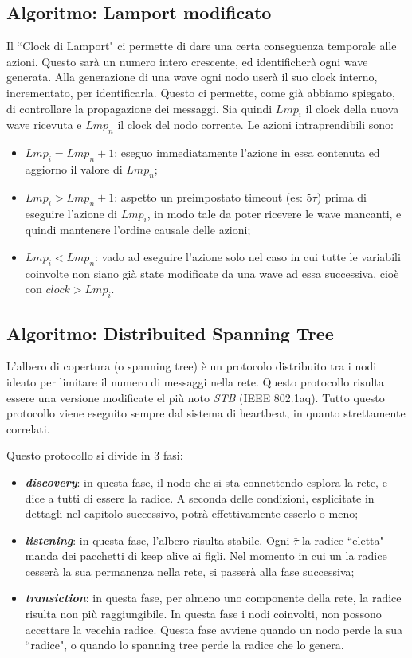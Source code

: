 \documentclass[italian]{memoir}
\begin{document}
\subsection{Algoritmo: Lamport modificato}
Il ``Clock di Lamport" ci permette di dare una certa conseguenza temporale alle azioni.
	   Questo sarà un numero intero crescente, ed identificherà ogni wave generata. Alla
	   generazione di una wave ogni nodo userà il suo clock interno, incrementato, per
	   identificarla. Questo ci permette, come già abbiamo spiegato, di controllare la
	   propagazione dei messaggi. Sia quindi $Lmp_i$ il clock della nuova wave ricevuta
	   e $Lmp_n$ il clock del nodo corrente. Le azioni intraprendibili sono:
\begin{itemize}
	\item $Lmp_i = Lmp_n + 1$: eseguo immediatamente l'azione in essa contenuta ed aggiorno
	   il valore di $Lmp_n$;
	\item $Lmp_i > Lmp_n + 1$: aspetto un preimpostato timeout (es: $5\tau$) prima di
	   eseguire l'azione di $Lmp_i$, in modo tale da poter ricevere le wave mancanti, e
	   quindi mantenere l'ordine causale delle azioni;
	\item $Lmp_i < Lmp_n$: vado ad eseguire l'azione solo nel caso in cui tutte le variabili
	   coinvolte non siano già state modificate da una wave ad essa successiva, cioè con
	   $clock > Lmp_i$.
\end{itemize}

\subsection{Algoritmo: Distribuited Spanning Tree}\label{algo:dstp}
L'albero di copertura (o spanning tree) è un protocolo distribuito tra i nodi ideato per limitare il numero di messaggi nella rete. Questo protocollo risulta essere una versione modificate el più noto \textit{STB} (IEEE 802.1aq). Tutto questo protocollo viene eseguito sempre dal sistema di heartbeat, in quanto strettamente correlati.

Questo protocollo si divide in 3 fasi:
\begin{itemize}
    \item \textit{\textbf{discovery}}: in questa fase, il nodo che si sta connettendo esplora la rete, e dice a tutti di essere la radice. A seconda delle condizioni, esplicitate in dettagli nel capitolo successivo, potrà effettivamente esserlo o meno;
    \item \textit{\textbf{listening}}: in questa fase, l'albero risulta stabile. Ogni $\bar{\tau}$ la radice ``eletta" manda dei pacchetti di keep alive ai figli. Nel momento in cui un la radice cesserà la sua permanenza nella rete, si passerà alla fase successiva;
    \item \textit{\textbf{transiction}}: in questa fase, per almeno uno componente della rete, la radice risulta non più raggiungibile. In questa fase i nodi coinvolti, non possono accettare la vecchia radice. Questa fase avviene quando un nodo perde la sua ``radice", o quando lo spanning tree perde la radice che lo genera.
\end{itemize}
\end{document}
